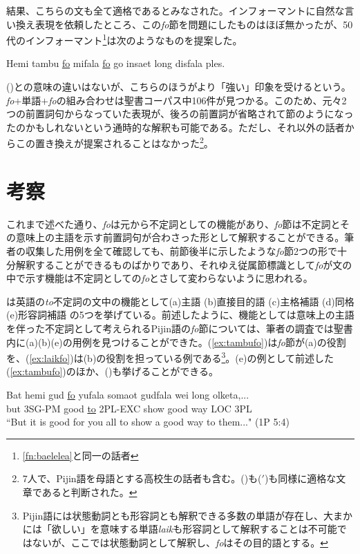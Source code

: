 結果、こちらの文も全て適格であるとみなされた。インフォーマントに自然な言い換え表現を依頼したところ、この\textit{fo}節を問題にしたものはほぼ無かったが、50代のインフォーマント\footnote{
\ref{fn:baelelea}と同一の話者}は次のようなものを提案した。

\begin{exe}
 Hemi tambu \underline{fo} mifala \underline{fo} go insaet long disfala ples.
\end{exe}

()との意味の違いはないが、こちらのほうがより「強い」印象を受けるという。\textit{fo}$+$単語$+$\textit{fo}の組み合わせは聖書コーパス中106件が見つかる。このため、元々2つの前置詞句からなっていた表現が、後ろの前置詞が省略されて節のようになったのかもしれないという通時的な解釈も可能である。ただし、それ以外の話者からこの置き換えが提案されることはなかった\footnote{
7人で、Pijin語を母語とする高校生の話者も含む。()も($'$)も同様に適格な文章であると判断された。}。
\section{考察}
これまで述べた通り、\textit{fo}は元から不定詞としての機能があり、\textit{fo}節は不定詞とその意味上の主語を示す前置詞句が合わさった形として解釈することができる。筆者の収集した用例を全て確認しても、前節後半に示したような\textit{fo}節2つの形で十分解釈することができるものばかりであり、それゆえ従属節標識として\textit{fo}が文の中で示す機能は不定詞としての\textit{fo}とさして変わらないように思われる。

\cite{english}は英語の\textit{to}不定詞の文中の機能として(a)主語 (b)直接目的語 (c)主格補語 (d)同格 (e)形容詞補語 の5つを挙げている。前述したように、機能としては意味上の主語を伴った不定詞として考えられるPijin語の\textit{fo}節については、筆者の調査では聖書内に(a)(b)(e)の用例を見つけることができた。(\ref{ex:tambufo})は\textit{fo}節が(a)の役割を、(\ref{ex:laikfo})は(b)の役割を担っている例である\footnote{
Pijin語には状態動詞とも形容詞とも解釈できる多数の単語が存在し\cite[xvi]{dictionary}、大まかには「欲しい」を意味する単語\textit{laik}も形容詞として解釈することは不可能ではないが、ここでは状態動詞として解釈し、\textit{fo}はその目的語とする。
}。(e)の例として前述した(\ref{ex:tambufo})のほか、()も挙げることができる。

\begin{exe}
  \ex
  \gll Bat hemi gud \underline{fo} yufala somaot gudfala wei long olketa,...\\
  but 3SG-PM good \underline{to} 2PL-EXC show good way LOC 3PL\\
  \glt ``But it is good for you all to show a good way to them..." (1P 5:4)
\end{exe}

